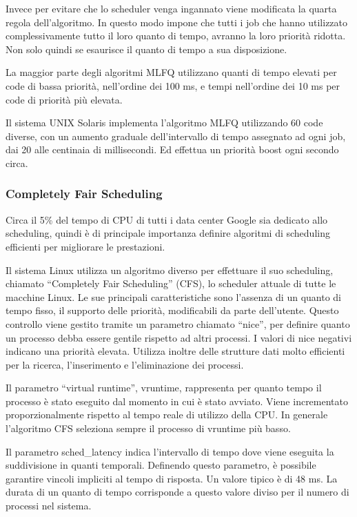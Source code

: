 \documentclass{article}
\numberwithin{equation}{subsection}
\begin{document}
Invece per evitare che lo scheduler venga ingannato viene modificata la quarta regola dell'algoritmo. In questo modo impone che tutti i job che hanno utilizzato 
complessivamente tutto il loro quanto di tempo, avranno la loro priorità ridotta. Non solo quindi se esaurisce il quanto di tempo a sua disposizione. 

La maggior parte degli algoritmi MLFQ utilizzano quanti di tempo elevati per code di bassa priorità, nell'ordine dei 100 ms, e tempi nell'ordine dei 10 ms per code di 
priorità più elevata. 

Il sistema UNIX Solaris implementa l'algoritmo MLFQ utilizzando 60 code diverse, con un aumento graduale dell'intervallo di tempo assegnato ad ogni job, dai 20 alle 
centinaia di millisecondi. Ed effettua un priorità boost ogni secondo circa. 


\subsubsection{Completely Fair Scheduling}

Circa il 5\% del tempo di CPU di tutti i data center Google sia dedicato allo scheduling, quindi è di principale importanza definire algoritmi di scheduling 
efficienti per migliorare le prestazioni. 

Il sistema Linux utilizza un algoritmo diverso per effettuare il suo scheduling, chiamato ``Completely Fair Scheduling'' (CFS), lo scheduler attuale di tutte le macchine 
Linux. Le sue principali caratteristiche sono l'assenza di un quanto di tempo fisso, il supporto delle priorità, modificabili da parte dell'utente. Questo controllo 
viene gestito tramite un parametro chiamato ``nice'', per definire quanto un processo debba essere gentile rispetto ad altri processi. I valori di nice negativi 
indicano una priorità elevata. Utilizza inoltre delle strutture dati molto efficienti per la ricerca, l'inserimento e l'eliminazione dei processi. 


Il parametro ``virtual runtime'', vruntime, rappresenta per quanto tempo il processo è stato eseguito dal momento in cui è stato avviato. Viene incrementato 
proporzionalmente rispetto al tempo reale di utilizzo della CPU. In generale l'algoritmo CFS seleziona sempre il processo di vruntime più basso. 

Il parametro sched\_latency indica l'intervallo di tempo dove viene eseguita la suddivisione in quanti temporali. Definendo questo parametro, è possibile 
garantire vincoli impliciti al tempo di risposta. Un valore tipico è di 48 ms. La durata di un quanto di tempo corrisponde a questo valore diviso per il numero di processi 
nel sistema. 
\end{document}
